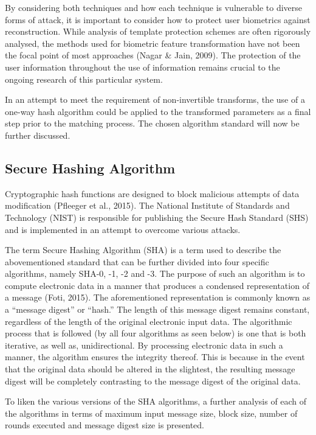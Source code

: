     
    By considering both techniques and how each technique is vulnerable to diverse forms of attack, it is important to consider how to protect user biometrics against reconstruction. While analysis of template protection schemes are often rigorously analysed, the methods used for biometric feature transformation have not been the focal point of most approaches (Nagar \& Jain, 2009). The protection of the user information throughout the use of information remains crucial to the ongoing research of this particular system. 
    
    In an attempt to meet the requirement of non-invertible transforms, the use of a one-way hash algorithm could be applied to the transformed parameters as a final step prior to the matching process. The chosen algorithm standard will now be further discussed.

    \subsection{ Secure Hashing Algorithm}
    
    Cryptographic hash functions are designed to block malicious attempts of data modification (Pfleeger et al., 2015). The National Institute of Standards and Technology (NIST) is responsible for publishing the Secure Hash Standard (SHS) and is implemented in an attempt to overcome various attacks. 
    
    The term Secure Hashing Algorithm (SHA) is a term used to describe the abovementioned standard that can be further divided into four specific algorithms, namely SHA-0, -1, -2 and -3. The purpose of such an algorithm is to compute electronic data in a manner that produces a condensed representation of a message (Foti, 2015). The aforementioned representation is commonly known as a “message digest” or “hash.” The length of this message digest remains constant, regardless of the length of the original electronic input data. The algorithmic process that is followed (by all four algorithms as seen below) is one that is both iterative, as well as, unidirectional. By processing electronic data in such a manner, the algorithm ensures the integrity thereof. This is because in the event that the original data should be altered in the slightest, the resulting message digest will be completely contrasting to the message digest of the original data. 
    
    To liken the various versions of the SHA algorithms, a further analysis of each of the algorithms in terms of maximum input message size, block size, number of rounds executed and message digest size is presented.
    
